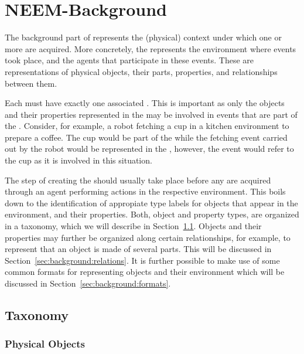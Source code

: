 
\chapter{NEEM-Background}
\label{ch:background}

The background part of \neems represents the (physical) context under which one or more \neems are acquired.
More concretely, the \neembak represents the environment where events took place, and the agents that participate in these events.
These are representations of physical objects, their parts, properties, and relationships between them.

Each \neem must have exactly one associated \neembak.
This is important as only the objects and their properties represented in the \neembak may be involved in events that are part of the \neem.
Consider, for example, a robot fetching a cup in a kitchen environment to prepare a coffee.
The cup would be part of the \neembak while the fetching event carried out by the robot would be represented in the \neemnar, however, the event would refer to the cup as it is involved in this situation.

The step of creating the \neembak should usually take place before any \neems are acquired through an agent performing actions in the respective environment.
This boils down to the identification of appropiate type labels for objects that appear in the environment, and their properties.
Both, object and property types, are organized in a taxonomy, which we will describe in Section~\ref{sec:background:taxonomy}.
Objects and their properties may further be organized along certain relationships, for example, to represent that an object is made of several parts.
This will be discussed in Section~\ref{sec:background:relations}.
It is further possible to make use of some common formats for representing objects and their environment which will be discussed in Section~\ref{sec:background:formats}.

\section{Taxonomy}
\label{sec:background:taxonomy}
\subsection{Physical Objects}

